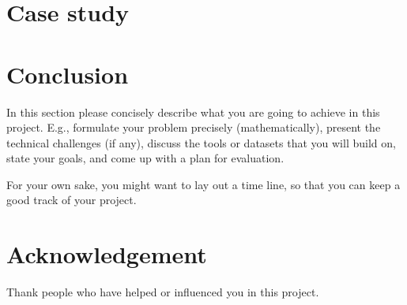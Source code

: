 \documentclass{article}
\begin{document}
\begin{table*}[t]
    \centering
    \small
    \caption{Accuracy with different loss function}
    \label{table:accuracy}
\end{table*}

\section{Case study}


\section{Conclusion}
In this section please concisely describe what you are going to achieve in this project. E.g., formulate your problem precisely (mathematically), present the technical challenges (if any), discuss the tools or datasets that you will build on, state your goals, and come up with a plan for evaluation.

For your own sake, you might want to lay out a time line, so that you can keep a good track of your project.

\newpage

\section*{Acknowledgement}
Thank people who have helped or influenced you in this project.

\nocite{*}



\end{document}
